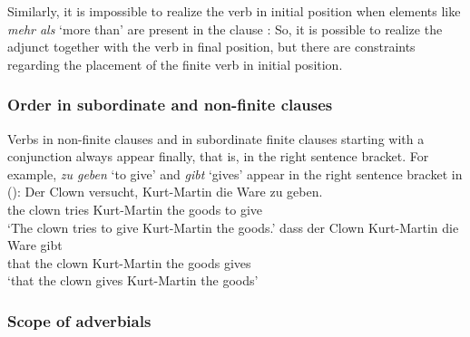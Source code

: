 \largerpage
Similarly, it is impossible to realize the verb in initial position when elements like
\emph{mehr als} `more than' are present in the clause \parencites[Section~3.1]{Haider97c}[]{Meinunger2001a}: 
\eal
{}
\zl
%
So, it is possible to realize the adjunct together with the verb in final position, but there are
constraints regarding the placement of the finite verb in initial position.


\subsubsection{Order in subordinate and non-finite clauses}

Verbs in non-finite clauses and in subordinate finite clauses starting with a conjunction
  always appear finally, that is, in the right sentence bracket. For example, \emph{zu geben} `to
  give' and \emph{gibt} `gives' appear in the right sentence bracket in ():
\eal
\ex 
\gll Der Clown versucht, Kurt-Martin die Ware zu geben.\\
     the clown tries     Kurt-Martin the goods to give\\
\glt `The clown tries to give Kurt-Martin the goods.'
\ex 
\gll dass der Clown Kurt-Martin die Ware gibt\\
     that the clown Kurt-Martin the goods gives\\
\glt `that the clown gives Kurt-Martin the goods'
\zl


\subsubsection{Scope of adverbials}

